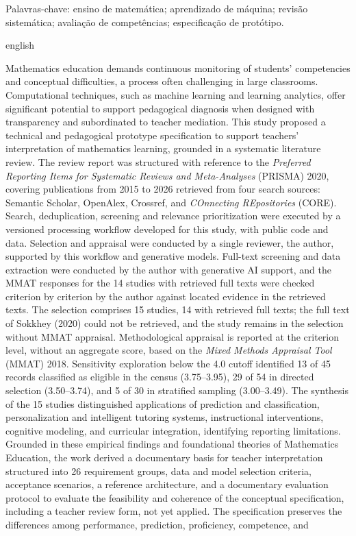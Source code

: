 \begin{resumo}
\vspace{0.2cm}
Palavras-chave: ensino de matemática; aprendizado de máquina; revisão sistemática; avaliação de competências; especificação de protótipo.

\end{resumo}

\begin{resumo}[Abstract]
\begin{otherlanguage*}{english}
\noindent

Mathematics education demands continuous monitoring of students' competencies and conceptual difficulties, a process often challenging in large classrooms. Computational techniques, such as machine learning and learning analytics, offer significant potential to support pedagogical diagnosis when designed with transparency and subordinated to teacher mediation. This study proposed a technical and pedagogical prototype specification to support teachers' interpretation of mathematics learning, grounded in a systematic literature review. The review report was structured with reference to the \textit{Preferred Reporting Items for Systematic Reviews and Meta-Analyses} (PRISMA) 2020, covering publications from 2015 to 2026 retrieved from four search sources: Semantic Scholar, OpenAlex, Crossref, and \textit{COnnecting REpositories} (CORE). Search, deduplication, screening and relevance prioritization were executed by a versioned processing workflow developed for this study, with public code and data. Selection and appraisal were conducted by a single reviewer, the author, supported by this workflow and generative models. Full-text screening and data extraction were conducted by the author with generative AI support, and the MMAT responses for the 14 studies with retrieved full texts were checked criterion by criterion by the author against located evidence in the retrieved texts. The selection comprises 15 studies, 14 with retrieved full texts; the full text of Sokkhey (2020) could not be retrieved, and the study remains in the selection without MMAT appraisal. Methodological appraisal is reported at the criterion level, without an aggregate score, based on the \textit{Mixed Methods Appraisal Tool} (MMAT) 2018. Sensitivity exploration below the 4.0 cutoff identified 13 of 45 records classified as eligible in the census (3.75--3.95), 29 of 54 in directed selection (3.50--3.74), and 5 of 30 in stratified sampling (3.00--3.49). The synthesis of the 15 studies distinguished applications of prediction and classification, personalization and intelligent tutoring systems, instructional interventions, cognitive modeling, and curricular integration, identifying reporting limitations. Grounded in these empirical findings and foundational theories of Mathematics Education, the work derived a documentary basis for teacher interpretation structured into 26 requirement groups, data and model selection criteria, acceptance scenarios, a reference architecture, and a documentary evaluation protocol to evaluate the feasibility and coherence of the conceptual specification, including a teacher review form, not yet applied. The specification preserves the differences among performance, prediction, proficiency, competence, and 
\end{otherlanguage*}
\end{resumo}
